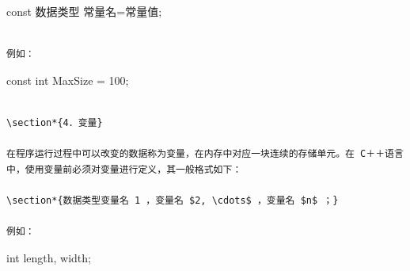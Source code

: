 \documentclass[10pt]{article}
\begin{document}
const 数据类型 常量名=常量值;

\begin{verbatim}

例如：
\end{verbatim}

const int MaxSize = 100;

\begin{verbatim}

\section*{4．变量}

在程序运行过程中可以改变的数据称为变量，在内存中对应一块连续的存储单元。在 C＋＋语言中，使用变量前必须对变量进行定义，其一般格式如下：

\section*{数据类型变量名 1 ，变量名 $2, \cdots$ ，变量名 $n$ ；}

例如：
\end{verbatim}

int length, width;
\end{document}
